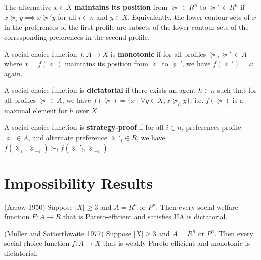 \documentclass[10pt]{article}
\begin{document}
\begin{spacing}{1.0}
\begin{definition}
  The alternative $x\in X$ \textbf{maintains its
    position} from $\succeq\,\in R^n$ to $\succeq' \,\in
  R^n$ if $x \succeq_i y \implies x \succeq' y$ for all
  $i\in n$ and $y \in X$. Equivalently, the lower contour
  sets of $x$ in the preferences of the first profile are
  subsets of the lower contour sets of the corresponding
  preferences in the second profile.
\end{definition}

\begin{definition}
  A social choice function $f: A \to X$ is
  \textbf{monotonic} if for all profiles $\succeq,
  \succeq'\,\in A$ where $x = f(\succeq)$ maintains its
  position from $\succeq$ to $\succeq'$, we have
  $f(\succeq')=x$ again.
\end{definition}

\begin{definition}
  A social choice function is \textbf{dictatorial} if
  there exists an agent $h\in n$ such that for all
  profiles $\succeq \,\in A$, we have $f(\succeq) =
  \{x\;|\; \forall y\in X, x\succeq_h y\}$,
  i.e. $f(\succeq)$ is a maximal element for $h$ over $X$.
\end{definition}

\begin{definition}
  A social choice function is \textbf{strategy-proof} if
  for all $i\in n$, preferences profile $\succeq\,\in A$,
  and alternate preference $\succeq'_i \in R$, we have
  $f(\succeq_i, \succeq_{-i}) \succ_i f(\succeq'_i, \succeq_{-i})$.
\end{definition}

\section{Impossibility Results}

\begin{theorem}
  (Arrow 1950) Suppose $|X| \geq 3$ and $A = R^n$ or
  $P^n$. Then every social welfare function $F:A\to R$
  that is Pareto-efficient and satisfies IIA is dictatorial.
\end{theorem}

\begin{theorem}
  (Muller and Satterthwaite 1977) Suppose $|X| \geq 3$
  and $A = R^n$ or $P^n$. Then every social choice
  function $f:A \to X$ that is weakly Pareto-efficient
  and monotonic is dictatorial.
\end{theorem}


\end{spacing}
\end{document}
